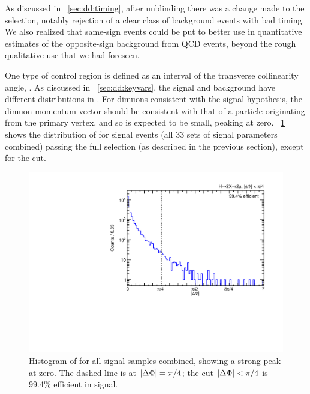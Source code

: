 As discussed in \Sec~\ref{sec:dd:timing}, after unblinding there was a change made to the selection, notably rejection of a clear class of background events with bad timing.
We also realized that same-sign events could be put to better use in quantitative estimates of the opposite-sign background from QCD events, beyond the rough qualitative use that we had foreseen.

One type of control region is defined as an interval of the transverse collinearity angle, \DeltaPhi.
As discussed in \Sec~\ref{sec:dd:keyvars}, the signal and background have different distributions in \DeltaPhi.
For dimuons consistent with the signal hypothesis, the dimuon momentum vector should be consistent with that of a particle originating from the primary vertex, and so \DeltaPhi is expected to be small, peaking at zero.
\Fig~\ref{fig:dd:deltaPhi_Sig} shows the distribution of \DeltaPhi for \twoMu signal events (all 33 sets of signal parameters combined) passing the full selection (as described in the previous section), except for the \DeltaPhi cut.

\begin{figure}[htpb]
  \centering
  \includegraphics[width=\DFigWidth]{figures/displaced/NM1_2Mu2J_deltaPhi.pdf}
  \caption[Histogram of \DeltaPhi for all \twoMu simulated signal samples combined, showing a strong peak at zero.]{Histogram of \DeltaPhi for all \twoMu signal samples combined, showing a strong peak at zero. The dashed line is at $|\Delta\Phi| = \pi/4$; the cut $|\Delta\Phi| < \pi/4$ is 99.4\% efficient in signal.}
  \label{fig:dd:deltaPhi_Sig}
\end{figure}

